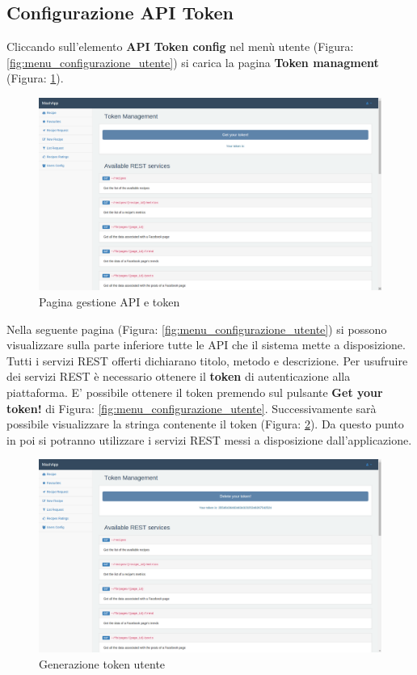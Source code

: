 	\subsection{Configurazione API Token} %
	\label{sec:settings_utente}
		Cliccando sull'elemento \textbf{API Token config} nel menù utente (Figura: \ref{fig:menu_configurazione_utente}) si carica la pagina \textbf{Token managment} (Figura: \ref{fig:token_config}).
		\begin{figure}[htbp]
			\centering
			\centerline{\includegraphics[width=14cm]{images/token_config.png}}
			\caption{Pagina gestione API e token}
			\label{fig:token_config}
		\end{figure}
		Nella seguente pagina (Figura: \ref{fig:menu_configurazione_utente}) si possono visualizzare sulla parte inferiore tutte le API che il sistema mette a disposizione. Tutti i servizi REST offerti dichiarano titolo, metodo e descrizione.\newline
		Per usufruire dei servizi REST è necessario ottenere il \textbf{token} di autenticazione alla piattaforma.\newline 
		E' possibile ottenere il token premendo sul pulsante \textbf{Get your token!} di Figura: \ref{fig:menu_configurazione_utente}.\newline
		Successivamente sarà possibile visualizzare la stringa contenente il token (Figura: \ref{fig:token_generate}). Da questo punto in poi si potranno utilizzare i servizi REST messi a disposizione dall'applicazione.
		\begin{figure}[htbp]
			\centering
			\centerline{\includegraphics[width=14cm]{images/token_generate.png}}
			\caption{Generazione token utente}
			\label{fig:token_generate}
		\end{figure}


